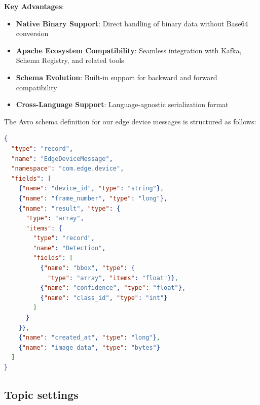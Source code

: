 \textbf{Key Advantages}:
\begin{itemize}
    \item \textbf{Native Binary Support}: Direct handling of binary data without Base64 conversion
    \item \textbf{Apache Ecosystem Compatibility}: Seamless integration with Kafka, Schema Registry, and related tools
    \item \textbf{Schema Evolution}: Built-in support for backward and forward compatibility
    \item \textbf{Cross-Language Support}: Language-agnostic serialization format
\end{itemize}

The Avro schema definition for our edge device messages is structured as follows:

\begin{lstlisting}[language=json, caption={Avro schema definition for edge device messages}]
{
  "type": "record",
  "name": "EdgeDeviceMessage",
  "namespace": "com.edge.device",
  "fields": [
    {"name": "device_id", "type": "string"},
    {"name": "frame_number", "type": "long"},
    {"name": "result", "type": {
      "type": "array",
      "items": {
        "type": "record",
        "name": "Detection",
        "fields": [
          {"name": "bbox", "type": {
            "type": "array", "items": "float"}},
          {"name": "confidence", "type": "float"},
          {"name": "class_id", "type": "int"}
        ]
      }
    }},
    {"name": "created_at", "type": "long"},
    {"name": "image_data", "type": "bytes"}
  ]
}
\end{lstlisting}

\subsection{Topic settings}

